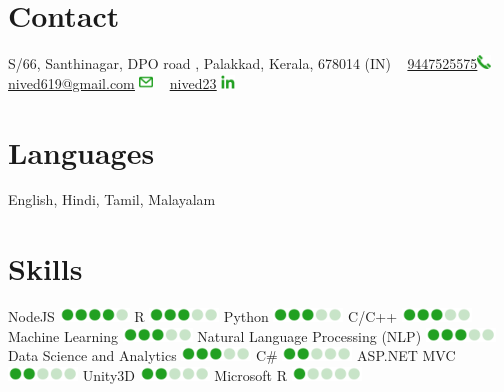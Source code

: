 \documentclass[]{cv-style}          %
\begin{document}
\newcommand{\Iconemail}{\includegraphics[width=1em]{email.png}}
\newcommand{\Icontel}{\includegraphics[width=1em]{tel.png}}
\newcommand{\Iconlinkedin}{\includegraphics[width=1em]{linkedin.png}}
\newcommand{\Iconone}{\includegraphics[width=5em]{1.png}}
\newcommand{\Icontwo}{\includegraphics[width=5em]{2.png}}
\newcommand{\Iconthree}{\includegraphics[width=5em]{3.png}}
\newcommand{\Iconfour}{\includegraphics[width=5em]{4.png}}
\newcommand{\Iconfive}{\includegraphics[width=5em]{5.png}}



\begin{aside}
%
\section{Contact}
S/66, Santhinagar, DPO road , Palakkad, Kerala, 678014 (IN)
~
\href{tel:+91 9447525575}{9447525575}\Icontel
~
\href{mailto:nived619@gmail.com}{\underline{nived619@gmail.com}} \Iconemail
~
\href{https://www.linkedin.com/in/nived23/}{\underline{nived23}} \Iconlinkedin 
%
\section{Languages}
English, Hindi, Tamil, Malayalam
%
\section{Skills}
NodeJS 
\Iconfour
R
\Iconthree
Python
\Iconthree
C/C++
\Iconthree
Machine Learning
\Iconthree
Natural Language Processing (NLP)
\Iconthree
Data Science and Analytics
\Iconthree
C\#
\Icontwo
ASP.NET MVC
\Icontwo
Unity3D
\Icontwo
Microsoft R
\Iconone
%
\end{aside}
\end{document}

